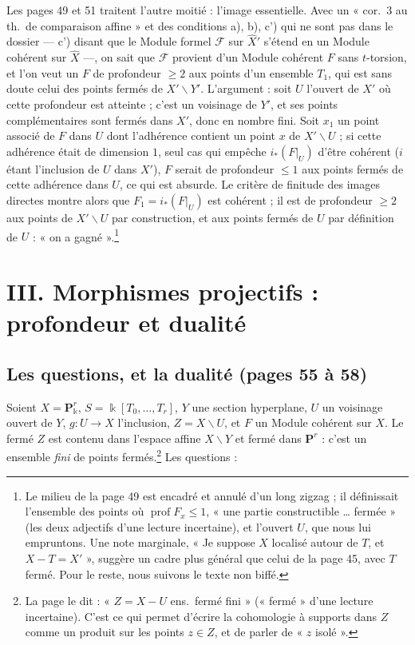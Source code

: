 \documentclass[11pt,a4paper]{article}
\begin{document}
Les pages 49 et 51 traitent l'autre moitié : l'image essentielle. Avec un «
cor.~3 au th.\ de comparaison affine » et des conditions a), b), c') qui ne
sont pas dans le dossier --- c') disant que le Module formel $\mathcal{F}$ sur
$\widehat{X}'$ s'étend en un Module cohérent sur $\widehat{X}$ ---, on sait
que $\mathcal{F}$ provient d'un Module cohérent $F$ sans $t$-torsion, et l'on
veut un $F$ de profondeur $\geq 2$ aux points d'un ensemble $T_1$, qui est
sans doute celui des points fermés de $X' \smallsetminus Y'$. L'argument :
soit $U$ l'ouvert de $X'$ où cette profondeur est atteinte ; c'est un
voisinage de $Y'$, et ses points complémentaires sont fermés dans $X'$, donc
en nombre fini. Soit $x_1$ un point associé de $F$ dans $U$ dont l'adhérence
contient un point $x$ de $X' \smallsetminus U$ ; si cette adhérence était de
dimension $1$, seul cas qui empêche $i_*(F|_U)$ d'être cohérent ($i$ étant
l'inclusion de $U$ dans $X'$), $F$ serait de profondeur $\leq 1$ aux points
fermés de cette adhérence dans $U$, ce qui est absurde. Le critère de finitude des images
directes montre alors que $F_1 = i_*(F|_U)$ est cohérent ; il est de profondeur $\geq 2$ aux points de
$X' \smallsetminus U$ par construction, et aux points fermés de $U$ par
définition de $U$ : « on a gagné ».\footnote{Le milieu de la page 49 est
encadré et annulé d'un long zigzag ; il définissait l'ensemble des points où
$\operatorname{prof} F_{x} \leq 1$, « une partie constructible … fermée »
(les deux adjectifs d'une lecture incertaine), et l'ouvert $U$, que nous lui
empruntons. Une note marginale, « Je suppose $X$
localisé autour de $T$, et $X - T = X'$ », suggère un cadre plus général que
celui de la page 45, avec $T$ fermé. Pour le reste, nous suivons le texte non
biffé.}

\section*{III. Morphismes projectifs : profondeur et dualité}

\subsection*{Les questions, et la dualité (pages 55 à 58)}

Soient $X = \mathbf{P}^r_{\Bbbk}$, $S = \Bbbk[T_0, \ldots, T_r]$, $Y$ une
section hyperplane, $U$ un voisinage ouvert de $Y$, $g\colon U \to X$
l'inclusion, $Z = X \smallsetminus U$, et $F$ un Module cohérent sur $X$. Le
fermé $Z$ est contenu dans l'espace affine $X \smallsetminus Y$ et fermé dans
$\mathbf{P}^r$ : c'est un ensemble \emph{fini} de points
fermés.\footnote{La page le dit : « $Z = X - U$ ens.\ fermé fini » (« fermé »
d'une lecture incertaine). C'est ce qui permet d'écrire la cohomologie à
supports dans $Z$ comme un produit sur les points $z \in Z$, et de parler de
« $z$ isolé ».} Les questions :
\end{document}
